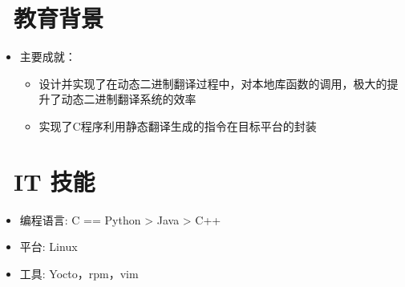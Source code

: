 \documentclass{resume}
\begin{document}
\section{\faGraduationCap\  教育背景}
\begin{itemize}
    \item {主要成就：}
    \begin{itemize}
        \item {设计并实现了在动态二进制翻译过程中，对本地库函数的调用，极大的提升了动态二进制翻译系统的效率}
        \item {实现了C程序利用静态翻译生成的指令在目标平台的封装}
    \end{itemize}
\end{itemize}



\section{\faCogs\ IT 技能}
\begin{itemize}[parsep=0.5ex]
  \item {编程语言: C == Python > Java > C++}
  \item 平台: Linux
  \item 工具: Yocto，rpm，vim
\end{itemize}
\end{document}
